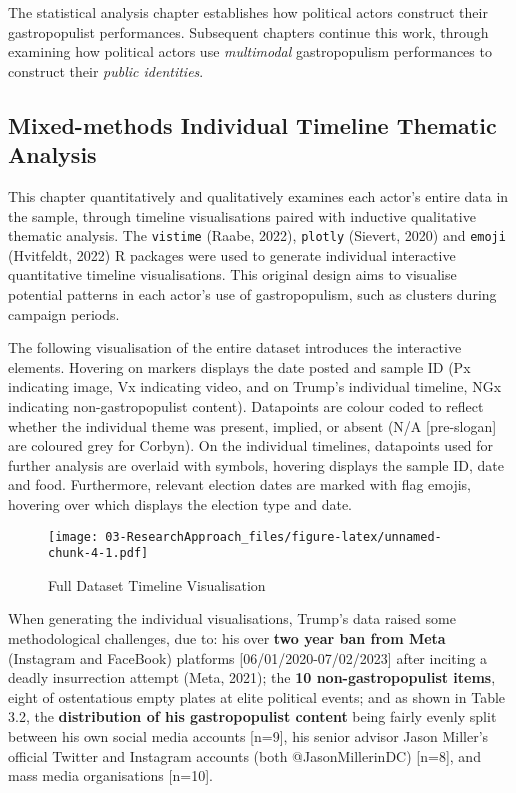 \documentclass[a4paper, nobind]{templates/ociamthesis}
\begin{document}
The statistical analysis chapter establishes how political actors construct their gastropopulist performances. Subsequent chapters continue this work, through examining how political actors use \emph{multimodal} gastropopulism performances to construct their \emph{public identities}.

\hypertarget{mixed-methods-individual-timeline-thematic-analysis}{%
\subsection*{Mixed-methods Individual Timeline Thematic Analysis}\label{mixed-methods-individual-timeline-thematic-analysis}}

This chapter quantitatively and qualitatively examines each actor's entire data in the sample, through timeline visualisations paired with inductive qualitative thematic analysis. The \texttt{vistime} (Raabe, 2022), \texttt{plotly} (Sievert, 2020) and \texttt{emoji} (Hvitfeldt, 2022) R packages were used to generate individual interactive quantitative timeline visualisations. This original design aims to visualise potential patterns in each actor's use of gastropopulism, such as clusters during campaign periods.

The following visualisation of the entire dataset introduces the interactive elements. Hovering on markers displays the date posted and sample ID (Px indicating image, Vx indicating video, and on Trump's individual timeline, NGx indicating non-gastropopulist content). Datapoints are colour coded to reflect whether the individual theme was present, implied, or absent (N/A {[}pre-slogan{]} are coloured grey for Corbyn). On the individual timelines, datapoints used for further analysis are overlaid with symbols, hovering displays the sample ID, date and food. Furthermore, relevant election dates are marked with flag emojis, hovering over which displays the election type and date.

\begin{figure}
\centering
\texttt{[image: 03-ResearchApproach\_files/figure-latex/unnamed-chunk-4-1.pdf]}
\caption{\label{fig:unnamed-chunk-4}Full Dataset Timeline Visualisation}
\end{figure}

When generating the individual visualisations, Trump's data raised some methodological challenges, due to: his over \textbf{two year ban from Meta} (Instagram and FaceBook) platforms {[}06/01/2020-07/02/2023{]} after inciting a deadly insurrection attempt (Meta, 2021); the \textbf{10 non-gastropopulist items}, eight of ostentatious empty plates at elite political events; and as shown in Table 3.2, the \textbf{distribution of his gastropopulist content} being fairly evenly split between his own social media accounts {[}n=9{]}, his senior advisor Jason Miller's official Twitter and Instagram accounts (both @JasonMillerinDC) {[}n=8{]}, and mass media organisations {[}n=10{]}.
\end{document}
